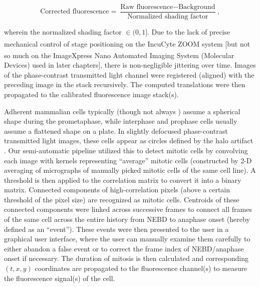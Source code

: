 \begin{equation*}
    \text{Corrected fluorescence} = \dfrac{\text{Raw fluorescence} - \text{Background}}{\text{Normalized shading factor}},
\end{equation*}

\noindent wherein the normalized shading factor $\in (0, 1]$. Due to the lack of precise mechanical control of stage positioning on the IncuCyte\textsuperscript{\textregistered} ZOOM system [but not so much on the ImageXpress\textsuperscript{\textregistered} Nano Automated Imaging System (Molecular Devices) used in later chapters], there is non-negligible jittering over time. Images of the phase-contrast transmitted light channel were registered (aligned) with the preceding image in the stack recursively. The computed translations were then propagated to the calibrated fluorescence image stack(s).

Adherent mammalian cells typically (though not always \cite{Syntelic+Merotelic}) assume a spherical shape during the prometaphase, while interphase and prophase cells usually assume a flattened shape on a plate. In slightly defocused phase-contrast transmitted light images, these cells appear as circles defined by the halo artifact \cite{PhaseContrastHalo}. Our semi-automatic pipeline utilized this to detect mitotic cells by convolving each image with kernels representing ``average'' mitotic cells (constructed by 2-D averaging of micrographs of manually picked mitotic cells of the same cell line). A threshold is then applied to the correlation matrix to convert it into a binary matrix. Connected components of high-correlation pixels (above a certain threshold of the pixel size) are recognized as mitotic cells. Centroids of these connected components were linked across successive frames to connect all frames of the same cell across the entire history from NEBD to anaphase onset (hereby defined as an ``event''). These events were then presented to the user in a graphical user interface, where the user can manually examine them carefully to either abandon a false event or to correct the frame index of NEBD/anaphase onset if necessary. The duration of mitosis is then calculated and corresponding $(t, x, y)$ coordinates are propagated to the fluorescence channel(s) to measure the fluorescence signal(s) of the cell.

